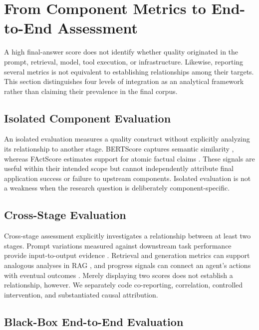 \section{From Component Metrics to End-to-End Assessment}
\label{sec:integration}

A high final-answer score does not identify whether quality originated in the prompt, retrieval, model, tool execution, or infrastructure. Likewise, reporting several metrics is not equivalent to establishing relationships among their targets. This section distinguishes four levels of integration as an analytical framework rather than claiming their prevalence in the final corpus.

\subsection{Isolated Component Evaluation}

An isolated evaluation measures a quality construct without explicitly analyzing its relationship to another stage. BERTScore captures semantic similarity \cite{zhang2020bertscore}, whereas FActScore estimates support for atomic factual claims \cite{min2023factscore}. These signals are useful within their intended scope but cannot independently attribute final application success or failure to upstream components. Isolated evaluation is not a weakness when the research question is deliberately component-specific.

\subsection{Cross-Stage Evaluation}

Cross-stage assessment explicitly investigates a relationship between at least two stages. Prompt variations measured against downstream task performance provide input-to-output evidence \cite{sclar2024formatting,chatterjee2024posix}. Retrieval and generation metrics can support analogous analyses in RAG \cite{es2024ragas,ru2024ragchecker}, and progress signals can connect an agent's actions with eventual outcomes \cite{ma2024agentboard}. Merely displaying two scores does not establish a relationship, however. We separately code co-reporting, correlation, controlled intervention, and substantiated causal attribution.

\subsection{Black-Box End-to-End Evaluation}

